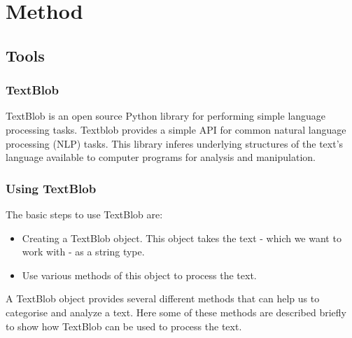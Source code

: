 \documentclass[a4paper]{article}
\begin{document}
 



\section{Method}  
\subsection{Tools}  
\subsubsection{TextBlob}
TextBlob is an open source Python library for performing simple language processing tasks. Textblob provides a simple API for common natural language processing (NLP) tasks. This library inferes underlying structures of the text's language available to computer programs for analysis and manipulation.

\subsubsection{Using TextBlob}

The basic steps to use TextBlob are:

\begin{itemize}  
\item Creating a TextBlob object. This object takes the text - which we want to work with - as a string type.
\item Use various methods of this object to process the text.
\end{itemize}

A TextBlob object provides several different methods that can help us to categorise and analyze a text. Here some of these methods are described briefly to show how TextBlob can be used to process the text. 
\end{document}
